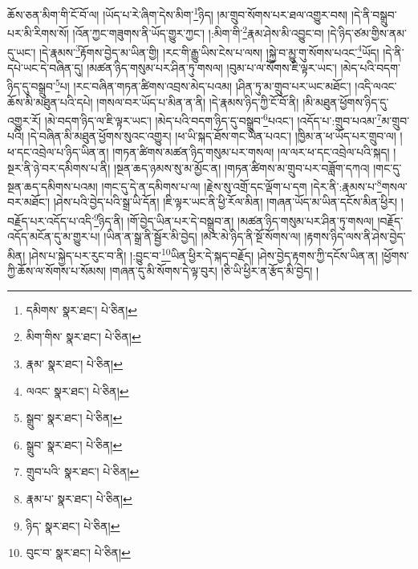 ཆོས་ཅན་མིག་གི་ངོ་བོ་ལ། །ཡོད་པ་རེ་ཞིག་དེས་མིག་\footnote{དམིགས་  སྣར་ཐང་།  པེ་ཅིན། }ཉིད། །མ་གྲུབ་སོགས་པར་ཐལ་འགྱུར་བས། །དེ་ནི་བསྒྲུབ་པར་མི་རིགས་སོ། །འོན་ཀྱང་གཟུགས་ནི་ཡོད་གྱུར་ཀྱང་། །:མིག་གི་\footnote{མིག་གིས་  སྣར་ཐང་།  པེ་ཅིན། }རྣམ་ཤེས་མི་འབྱུང་བ། །དེ་ཉིད་ཙམ་གྱིས་ནམ་དུ་ཡང་། །དེ་རྣམས་\footnote{རྣམ་  སྣར་ཐང་།  པེ་ཅིན། }རྟོགས་བྱེད་མ་ཡིན་གྱི། །རང་གི་རྒྱུ་ཡིས་ངེས་པ་ལས། །སྐྱེ་བ་མྱུ་གུ་སོགས་པའང་\footnote{ལའང་  སྣར་ཐང་།  པེ་ཅིན། }ཡོད། །དེ་ནི་དཔེ་ཡང་དེ་བཞིན་དུ། །མཚན་ཉིད་གསུམ་པར་ཤིན་ཏུ་གསལ། །བུམ་པ་ལ་སོགས་ཇི་ལྟར་ཡང་། །མེད་པའི་བདག་ཉིད་དུ་བསྒྲུབ་\footnote{སྒྲུབ་  སྣར་ཐང་།  པེ་ཅིན། }པ། །རང་བཞིན་གཏན་ཚིགས་འབྲས་མེད་པའམ། །ཤིན་ཏུ་མ་གྲུབ་པར་ཡང་མཐོང་། །འདི་ལའང་ཆོས་མི་མཐུན་པའི་དཔེ། །གསལ་བར་ཡོད་པ་མིན་ན་ནི། །དེ་རྣམས་ཉིད་ཀྱི་ངོ་བོ་ནི། །མི་མཐུན་ཕྱོགས་ཉིད་དུ་འགྱུར་རོ། །མེ་བདག་ཉིད་ལ་ཇི་ལྟར་ཡང་། །མེད་པའི་བདག་ཉིད་དུ་བསྒྲུབ་\footnote{སྒྲུབ་  སྣར་ཐང་།  པེ་ཅིན། }པའང་། །འདོད་པ་:གྲུབ་པའམ་\footnote{གྲུབ་པའི་  སྣར་ཐང་།  པེ་ཅིན། }མ་གྲུབ་པའི། །དེ་བཞིན་མི་མཐུན་ཕྱོགས་སུའང་འགྱུར། །ཕ་ཡི་སྐད་ཐོས་གང་ཡིན་པའང་། །ཁྱིམ་ན་ཕ་ཡོད་པར་གྲུབ་ལ། །ཕ་དང་འབྲེལ་པ་ཉིད་ཡིན་ན། །གཏན་ཚིགས་མཚན་ཉིད་གསུམ་པར་གསལ། །ལ་ལར་ཕ་དང་འབྲེལ་པའི་སྐད། །སྔར་ནི་ཉེ་བར་དམིགས་པ་ནི། །སྔན་ཆད་ཉམས་སུ་མ་མྱོང་ན། །གཏན་ཚིགས་མ་གྲུབ་པར་བཟློག་དཀའ། །གང་དུ་སྔན་ཆད་དམིགས་པའམ། །གང་དུ་དེ་ན་དམིགས་པ་ལ། །རྗེས་སུ་འགྲོ་དང་ལྡོག་པ་དག །དེར་ནི་:རྣམས་པ་\footnote{རྣམ་པ་  སྣར་ཐང་།  པེ་ཅིན། }གསལ་བར་མཐོང་། །ཤེས་པའི་བྱེད་པའི་སྒྲ་ཡི་དོན། །ཇི་ལྟར་ཡང་ནི་ཕྱི་རོལ་མིན། །གཞན་ཡོད་མ་ཡིན་དངོས་མིན་ཕྱིར། །བརྗོད་པར་འདོད་པ་འདི་\footnote{ཉིད་  སྣར་ཐང་།  པེ་ཅིན། }ཉིད་ནི། །གོ་བྱེད་ཡིན་པར་དེ་བསྒྲུབ་ན། །མཚན་ཉིད་གསུམ་པར་ཤིན་ཏུ་གསལ། །བརྗོད་འདོད་མངོན་དུ་མ་གྱུར་པ། །ཡིན་ན་སྒྲ་ནི་སྦྱོར་མི་བྱེད། །མར་མེ་ཉིད་ནི་སྔོ་སོགས་ལ། །རྟགས་ཉིད་ལས་ནི་ཤེས་བྱེད་མིན། །ཤེས་པ་སྐྱེད་པར་རུང་བ་ནི། །:བྱུང་བ་\footnote{བུང་བ་  སྣར་ཐང་།  པེ་ཅིན། }ཡིན་ཕྱིར་དེ་སྐད་བརྗོད། །ཤེས་བྱེད་རྟགས་ཀྱི་དངོས་ཡིན་ན། །ཕྱོགས་ཀྱི་ཆོས་ལ་སོགས་པ་སོམས། །གཞན་དུ་མི་སོགས་དེ་ལྟ་བུར། །ཅི་ཡི་ཕྱིར་ན་རྩོད་མི་བྱེད། །
